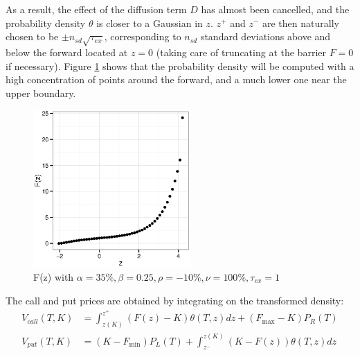 \documentclass[]{rAMF2e}
\begin{document}
As a result, the effect of the diffusion term $D$ has almost been cancelled, and the probability density $\theta$ is closer to a Gaussian in $z$. $z^+$ and $z^-$ are then naturally chosen to be $\pm n_{sd}\sqrt{\tau_{ex}}$, corresponding to $n_{sd}$ standard deviations above and below the forward located at $z=0$ (taking care of truncating at the barrier $F=0$ if necessary). Figure \ref{fig:Fz} shows that the probability density will be computed with a high concentration of points around the forward, and a much lower one near the upper boundary.

\begin{figure}[htb]
  \begin{center}  
    \includegraphics[width=6cm]{fz.eps}
  \end{center}
     \caption{\label{fig:Fz} F(z) with $\alpha=35\%, \beta=0.25, \rho=-10\%, \nu=100\%, \tau_{ex}=1$}
\end{figure}

The call and put prices are obtained by integrating on the transformed density:
\begin{align}
V_{call} (T, K) &= \int_{z(K)}^{z^{+}} (F(z)-K) \theta(T,z) dz + (F_{\max} - K) P_R(T) \\
V_{put} (T, K) &= (K-F_{\min}) P_L(T) + \int_{z^{-}}^{z(K)} (K-F(z)) \theta(T,z) dz
\end{align}
\end{document}
